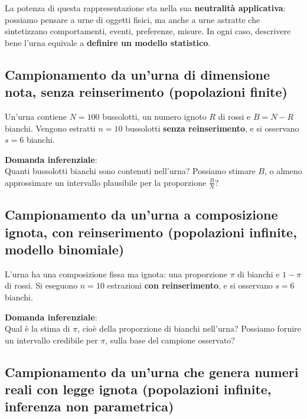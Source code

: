 \documentclass[
  11pt,
]{book}
\theoremstyle{mytheoremstyle}
\theoremstyle{mydefstyle}
\begin{document}
La potenza di questa rappresentazione sta nella sua \textbf{neutralità applicativa}: possiamo pensare a urne di oggetti fisici, ma anche a urne astratte che sintetizzano comportamenti, eventi, preferenze, misure. In ogni caso, descrivere bene l'urna equivale a \textbf{definire un modello statistico}.

\subsection{\texorpdfstring{Campionamento da un'urna di dimensione nota, senza reinserimento \textbf{(popolazioni finite)}}{Campionamento da un'urna di dimensione nota, senza reinserimento (popolazioni finite)}}\label{campionamento-da-unurna-di-dimensione-nota-senza-reinserimento-popolazioni-finite}

Un'urna contiene \(N = 100\) bussolotti, un numero ignoto \(R\) di rossi e \(B = N - R\) bianchi. Vengono estratti \(n = 10\) bussolotti \textbf{senza reinserimento}, e si osservano \(s = 6\) bianchi.

\textbf{Domanda inferenziale}:\\
Quanti bussolotti bianchi sono contenuti nell'urna? Possiamo stimare \(B\), o almeno approssimare un intervallo plausibile per la proporzione \(\frac{B}{N}\)?

\subsection{\texorpdfstring{Campionamento da un'urna a composizione ignota, con reinserimento \textbf{(popolazioni infinite, modello binomiale)}}{Campionamento da un'urna a composizione ignota, con reinserimento (popolazioni infinite, modello binomiale)}}\label{campionamento-da-unurna-a-composizione-ignota-con-reinserimento-popolazioni-infinite-modello-binomiale}

L'urna ha una composizione fissa ma ignota: una proporzione \(\pi\) di bianchi e \(1 - \pi\) di rossi. Si eseguono \(n = 10\) estrazioni \textbf{con reinserimento}, e si osservano \(s = 6\) bianchi.

\textbf{Domanda inferenziale}:\\
Qual è la stima di \(\pi\), cioè della proporzione di bianchi nell'urna? Possiamo fornire un intervallo credibile per \(\pi\), sulla base del campione osservato?

\subsection{\texorpdfstring{Campionamento da un'urna che genera numeri reali con legge ignota \textbf{(popolazioni infinite, inferenza non parametrica)}}{Campionamento da un'urna che genera numeri reali con legge ignota (popolazioni infinite, inferenza non parametrica)}}\label{campionamento-da-unurna-che-genera-numeri-reali-con-legge-ignota-popolazioni-infinite-inferenza-non-parametrica}
\end{document}
